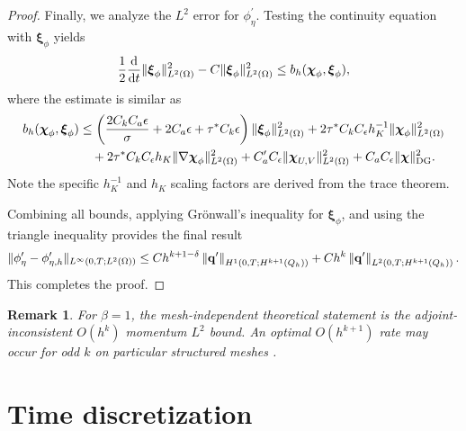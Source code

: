 \documentclass[pdflatex,sn-mathphys-num]{sn-jnl}%
\theoremstyle{thmstyleone}%
\theoremstyle{thmstyletwo}%
\newtheorem{remark}{Remark}%
\theoremstyle{thmstylethree}%
\begin{document}
\begin{proof}
Finally, we analyze the $L^2$ error for $\phi_\eta^\prime$. Testing the continuity equation with $\boldsymbol{\xi}_\phi$ yields
\begin{equation}\notag
\frac{1}{2}\frac{\mathrm{d}}{\mathrm{d}t}\|\boldsymbol{\xi}_{\phi}\|_{L^2(\Omega)}^2
 - C\|\boldsymbol{\xi}_{\phi}\|_{L^2(\Omega)}^2 \le b_h(\boldsymbol{\chi}_{\phi}, \boldsymbol{\xi}_{\phi}),
\end{equation}
where the estimate is similar as
\begin{equation}\notag
\begin{aligned}
b_h(\boldsymbol{\chi}_{\phi}, \boldsymbol{\xi}_{\phi}) &\le
 \left( \frac{2C_k C_a\epsilon}{\sigma} + 2C_a \epsilon + \tau^*C_k\epsilon \right)\| \boldsymbol{\xi}_\phi\|_{L^2(\Omega)}^2 
+ 2\tau^* C_k C_\epsilon h_K^{-1}\| \boldsymbol{\chi}_{\phi}\|_{L^2(\Omega)}^2 \\
& \quad + 2\tau^* C_k C_\epsilon h_K \|\nabla \boldsymbol{\chi}_{\phi}\|_{L^2(\Omega)}^2  
+  C_a^\prime C_\epsilon \|\boldsymbol{\chi}_{U,V}\|_{L^2(\Omega)}^2 + C_a C_\epsilon \|\boldsymbol{\chi}\|_{\mathrm{DG}}^2.
\end{aligned}
\end{equation}
Note the specific $h_K^{-1}$ and $h_K$ scaling factors are derived from the trace theorem. 

Combining all bounds, applying Gr\"onwall's inequality for $\boldsymbol{\xi}_\phi$, and using the triangle inequality provides the final result
\begin{equation}\notag
\begin{aligned}
\|\phi_\eta^\prime-\phi_{\eta,h}^\prime\|_{L^\infty(0,T;L^2(\Omega))}  \le Ch^{k+1-\delta}\left\|\mathbf{q}^\prime\right\|_{H^1(0,T;H^{k+1}(Q_h))} + Ch^{k} \left\|\mathbf{q}^\prime \right\|_{L^2(0,T;H^{k+1}(Q_h))}.
\end{aligned}
\end{equation}
This completes the proof.
\end{proof}

\begin{remark}
For $\beta=1$, the mesh-independent theoretical statement is the adjoint-inconsistent $O(h^k)$ momentum $L^2$ bound. An optimal $O(h^{k+1})$ rate may 
occur for odd $k$ on particular structured meshes \cite{Houston2002,Larson2004}.
\end{remark}

\section{Time discretization}
\label{sec:time}
\end{document}
